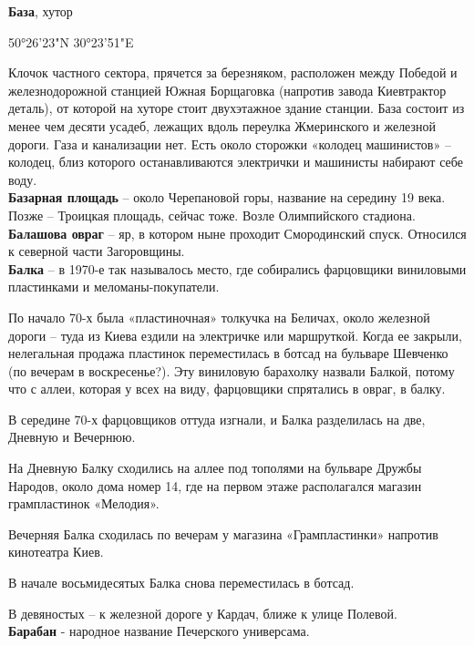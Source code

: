 \textbf{База}, хутор

50°26'23"N 30°23'51"E

Клочок частного сектора, прячется за березняком, расположен между Победой и железнодорожной станцией Южная Борщаговка (напротив завода Киевтрактор деталь), от которой на хуторе стоит двухэтажное здание станции. База состоит из менее чем десяти усадеб, лежащих вдоль переулка Жмеринского и железной дороги. Газа и канализации нет. Есть около сторожки «колодец машинистов» – колодец, близ которого останавливаются электрички и машинисты набирают себе воду.\\

\textbf{Базарная площадь} – около Черепановой горы, название на середину 19 века. Позже – Троицкая площадь, сейчас тоже. Возле Олимпийского стадиона.\\

\textbf{Балашова овраг} – яр, в котором ныне проходит Смородинский спуск. Относился к северной части Загоровщины.\\

\textbf{Балка} – в 1970-е так называлось место, где собирались фарцовщики виниловыми пластинками и меломаны-покупатели. 

По начало 70-х была «пластиночная» толкучка на Беличах, около железной дороги – туда из Киева ездили на электричке или маршруткой. Когда ее закрыли, нелегальная продажа пластинок переместилась в ботсад на бульваре Шевченко (по вечерам в воскресенье?). Эту виниловую барахолку назвали Балкой, потому что с аллеи, которая у всех на виду, фарцовщики спрятались в овраг, в балку.

В середине 70-х фарцовщиков оттуда изгнали, и Балка разделилась на две, Дневную и Вечернюю.

На Дневную Балку сходились на аллее под тополями на бульваре Дружбы Народов, около дома номер 14, где на первом этаже располагался магазин грампластинок «Мелодия».

Вечерняя Балка сходилась по вечерам у магазина «Грампластинки» напротив кинотеатра Киев.

В начале восьмидесятых Балка снова переместилась в ботсад. 

В девяностых – к железной дороге у Кардач, ближе к улице Полевой.\\


\textbf{Барабан} - народное название Печерского универсама.\\

